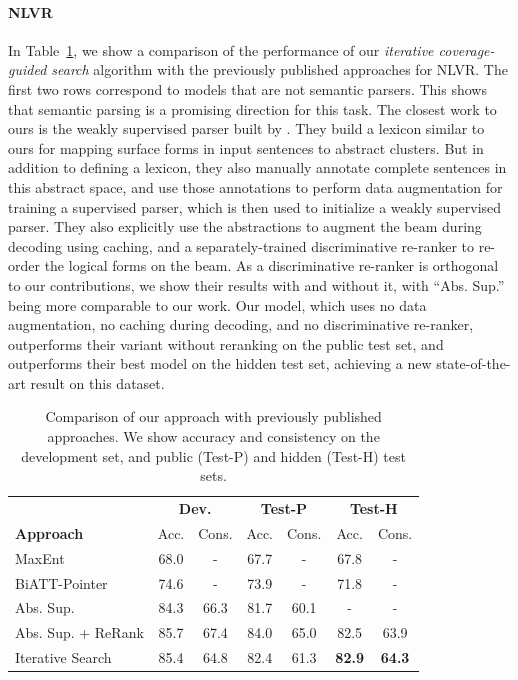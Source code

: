 \paragraph{NLVR} In Table~\ref{tab:main_result}, we show a comparison of the performance of our \textit{iterative coverage-guided search} algorithm with the previously published approaches for NLVR. The first two rows correspond to models that are not semantic parsers. This shows that semantic parsing is a promising direction for this task. The closest work to ours is the weakly supervised parser built by \cite{goldman2017weakly}. They build a lexicon similar to ours for mapping surface forms in input sentences to abstract clusters. But in addition to defining a lexicon, they also manually annotate complete sentences in this abstract space, and use those annotations to perform data augmentation for training a supervised parser, which is then used to initialize a weakly supervised parser. They also explicitly use the abstractions to augment the beam during decoding using caching, and a separately-trained discriminative re-ranker to re-order the logical forms on the beam.  As a discriminative re-ranker is orthogonal to our contributions, we show their results with and without it, with ``Abs. Sup.'' being more comparable to our work. Our model, which uses no data augmentation, no caching during decoding, and no discriminative re-ranker, outperforms their variant without reranking on the public test set, and outperforms their best model on the hidden test set, achieving a new state-of-the-art result on this dataset.

\begin{table}
    \centering
    \begin{tabular}{lcccccc}
        \toprule
        \multicolumn{1}{c}{} & \multicolumn{2}{c}{\textbf{Dev.}} & \multicolumn{2}{c}{\textbf{Test-P}} & \multicolumn{2}{c}{\textbf{Test-H}} \\
        \textbf{Approach} & Acc. & Cons. & Acc. & Cons. & Acc. & Cons.\\
        \midrule
        MaxEnt \citep{suhr2017corpus} & 68.0 & - & 67.7 & - & 67.8 & - \\
        BiATT-Pointer \citep{tan2018object} & 74.6 & - & 73.9 & - & 71.8 & - \\
        Abs. Sup. \citep{goldman2017weakly} & 84.3 & 66.3 & 81.7 & 60.1 & - & - \\
        Abs. Sup. + ReRank \citep{goldman2017weakly} & 85.7 & 67.4 & 84.0 & 65.0 & 82.5 & 63.9 \\
        Iterative Search & 85.4 & 64.8 & 82.4 & 61.3 & \textbf{82.9} & \textbf{64.3} \\
        \bottomrule
    \end{tabular}
    \caption{Comparison of our approach with previously published approaches. We show accuracy and consistency on the development set, and public (Test-P) and hidden (Test-H) test sets.}
    \label{tab:main_result}
\end{table}


